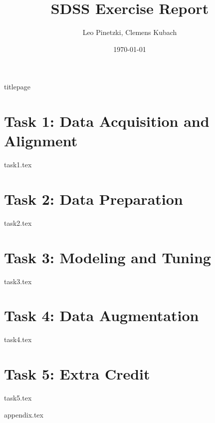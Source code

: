 \documentclass[12pt,twoside]{book}
\title{SDSS Exercise Report}
\author{Leo Pinetzki, Clemens Kubach}
\date{\today}
\theoremstyle{definition}
\begin{document}
\frontmatter
{titlepage}
\clearpage

\tableofcontents
\listoffigures
\listoftables

\mainmatter
\pagestyle{mainmatter}

\chapter{Task 1: Data Acquisition and Alignment}
\label{ch:task1}
{task1.tex}

\chapter{Task 2: Data Preparation}
\label{ch:task2}
{task2.tex}

\chapter{Task 3: Modeling and Tuning}
\label{ch:task3}
{task3.tex}

\chapter{Task 4: Data Augmentation}
\label{ch:task4}
{task4.tex}

\chapter{Task 5: Extra Credit}
\label{ch:task5}
{task5.tex}

\appendix
\label{ch:appendix}
{appendix.tex}

\backmatter
\nocite{*}
\printbibliography
\end{document}
